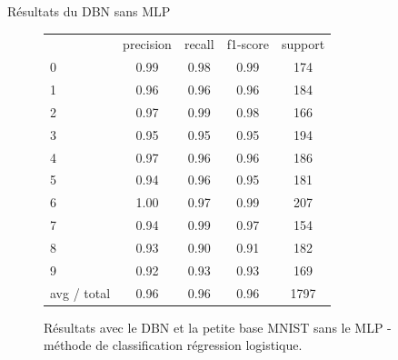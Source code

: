 \begin{frame}{Résultats du DBN sans MLP}
	\begin{figure}[ht!]
	\centering
	\begin{tabular}{l|c|c|c|c}
	& precision   & recall  &f1-score &  support \\
          0&       0.99&      0.98&      0.99&       174\\
          1 &      0.96 &     0.96 &     0.96 &      184\\
          2  &     0.97 &     0.99  &    0.98  &     166\\
          3   &    0.95 &     0.95  &    0.95   &    194\\
          4    &   0.97 &     0.96   &   0.96   &    186\\
          5     &  0.94  &    0.96    &  0.95    &   181\\
          6      & 1.00   &   0.97     & 0.99    &   207\\
          7       &0.94   &   0.99     & 0.97     &  154\\
          8       &0.93   &   0.90     & 0.91     &  182\\
          9       &0.92    &  0.93     & 0.93     &  169\\
avg / total       &0.96     & 0.96     & 0.96     & 1797\\
	\end{tabular}
	\caption{Résultats avec le DBN et la petite base MNIST sans le MLP - méthode de classification régression logistique.}
	\end{figure} 
\end{frame}



